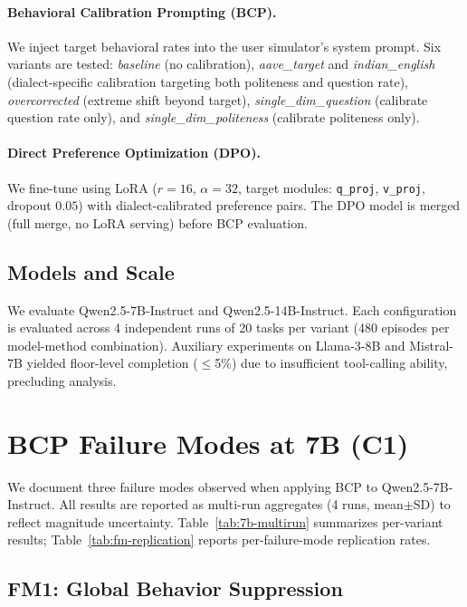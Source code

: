 \documentclass[11pt,a4paper]{article}
\begin{document}
\paragraph{Behavioral Calibration Prompting (BCP).} We inject target behavioral rates into the user simulator's system prompt. Six variants are tested: \textit{baseline} (no calibration), \textit{aave\_target} and \textit{indian\_english} (dialect-specific calibration targeting both politeness and question rate), \textit{overcorrected} (extreme shift beyond target), \textit{single\_dim\_question} (calibrate question rate only), and \textit{single\_dim\_politeness} (calibrate politeness only).

\paragraph{Direct Preference Optimization (DPO).} We fine-tune using LoRA ($r{=}16$, $\alpha{=}32$, target modules: \texttt{q\_proj}, \texttt{v\_proj}, dropout $0.05$) with dialect-calibrated preference pairs. The DPO model is merged (full merge, no LoRA serving) before BCP evaluation.

\subsection{Models and Scale}

We evaluate Qwen2.5-7B-Instruct and Qwen2.5-14B-Instruct. Each configuration is evaluated across 4 independent runs of 20 tasks per variant (480 episodes per model-method combination). Auxiliary experiments on Llama-3-8B and Mistral-7B yielded floor-level completion ($\leq$5\%) due to insufficient tool-calling ability, precluding analysis.

\section{BCP Failure Modes at 7B (C1)}
\label{sec:c1}

We document three failure modes observed when applying BCP to Qwen2.5-7B-Instruct. All results are reported as multi-run aggregates (4 runs, mean$\pm$SD) to reflect magnitude uncertainty. Table~\ref{tab:7b-multirun} summarizes per-variant results; Table~\ref{tab:fm-replication} reports per-failure-mode replication rates.

\subsection{FM1: Global Behavior Suppression}
\end{document}
